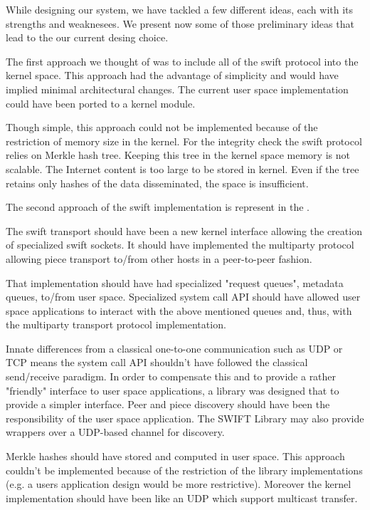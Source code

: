 While designing our system, we have tackled a few different ideas, each with its strengths and weaknesees. We present
now some of those preliminary ideas that lead to the our current desing choice.

The first approach we thought of was to include all of the swift protocol into the kernel space. This
approach had the advantage of simplicity and would have implied minimal architectural changes. The current user space 
implementation could have been ported to a kernel module.

Though simple, this approach could not be implemented because of the restriction of memory size in the kernel.
For the integrity check the swift protocol relies on Merkle hash tree. Keeping this tree in the kernel space memory is
not scalable. The Internet content is too large to be stored in kernel. Even if the tree retains only hashes of the data
disseminated, the space is insufficient.



The second approach of the swift implementation is represent in the .


The swift transport should have been a new kernel interface allowing the creation of specialized swift sockets. It
should have implemented the multiparty protocol allowing piece transport to/from other hosts in a peer-to-peer fashion.

That implementation should have had specialized "request queues", metadata queues, to/from user space.  Specialized
system call API should have allowed user space applications to interact with the above
mentioned queues and, thus, with the multiparty transport protocol implementation.

Innate differences from a classical one-to-one communication such as UDP or TCP means the system call API shouldn't have
followed the classical send/receive paradigm. In order to compensate this and to provide a rather "friendly" interface
to user space applications, a library was designed that to provide a simpler interface. Peer and piece discovery should
have been the responsibility of the user space application. The SWIFT Library may also provide wrappers over a UDP-based
channel for discovery. 

Merkle hashes should have stored and computed in user space. This approach couldn't be implemented because of the
restriction of the library implementations (e.g. a users application design would be more restrictive). Moreover the
kernel implementation should have been like an UDP which support multicast transfer.  


